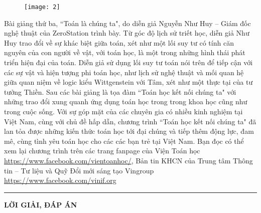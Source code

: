 \begin{multicols}{2}
	\begin{figure}[H]
		\centering
		\vspace*{-5pt}
		\captionsetup{labelformat= empty, justification=centering}
		\texttt{[image: 2]}
		\vspace*{-10pt}
	\end{figure}
	Bài giảng thứ ba, ``Toán là chúng ta", do diễn giả Nguyễn Như Huy -- Giám đốc nghệ thuật của ZeroStation trình bày. Từ góc độ lịch sử triết học, diễn giả Như Huy trao đổi về sự khác biệt giữa toán, xét như một lối suy tư có tính căn nguyên của con người về vật, với toán học, là một trong những hình thái phát triển hiện đại của toán. Diễn giả sử dụng lối suy tư toán nói trên để tiếp cận với các sự vật và hiện tượng phi toán học, như lịch sử nghệ thuật và mối quan hệ giữa quan niệm về logic kiểu Wittgenstein với Tâm, xét như một thực tại của tư tưởng Thiền. 
	\vskip 0.1cm
	Sau các bài giảng là tọa đàm ``Toán học kết nối chúng ta" với những trao đổi xung quanh ứng dụng toán học trong trong khoa học cũng như trong cuộc sống. Với sự góp mặt của các chuyên gia có nhiều kinh nghiệm tại Việt Nam, cùng với chủ đề hấp dẫn, chương trình ``Toán học kết nối chúng ta" đã lan tỏa được những kiến thức toán học tới đại chúng và tiếp thêm động lực, đam mê, cùng tình yêu toán học cho các các bạn trẻ tại Việt Nam. Bạn đọc có thể xem lại chương trình trên các trang fanpage của Viện Toán học \url{https://www.facebook.com/vientoanhoc/}, Bản tin KHCN của Trung tâm Thông tin -- Tư liệu và Quỹ Đổi mới sáng tạo Vingroup \url{https://www.facebook.com/vinif.org}
\end{multicols}
\vspace*{-10pt}
\rule{1\linewidth}{0.1pt}
\vspace*{-20pt}
\begin{center}
	\LARGE\textbf{\color{doisongtoanhoc}LỜI GIẢI, ĐÁP ÁN}
\end{center}
